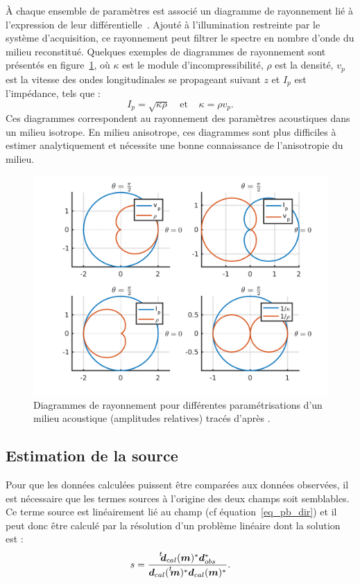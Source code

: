 À chaque ensemble de paramètres est associé un diagramme de rayonnement lié à l'expression de leur différentielle~\citep{forgues}. Ajouté à l'illumination restreinte  par le système d'acquisition, ce rayonnement peut filtrer le spectre en nombre d'onde du milieu reconstitué. Quelques exemples de diagrammes de rayonnement sont présentés en figure~\ref{rayonnement}, où $\kappa$ est le module d'incompressibilité, $\rho$ est la densité, $v_{p}$ est la vitesse des ondes longitudinales se propageant suivant $z$ et $I_{p}$ est l'impédance, tels que : 
\begin{equation*}
	I_{p}=\sqrt{\kappa \rho}~~~~~\text{et}~~~~~\kappa=\rho v_{p}\text{.}
\end{equation*}
Ces diagrammes correspondent au rayonnement des paramètres acoustiques dans un milieu isotrope. En milieu anisotrope, ces diagrammes sont plus difficiles à estimer analytiquement et nécessite une bonne connaissance de l'anisotropie du milieu.

\begin{figure}[!h]
	\centering
	\includegraphics[scale=0.7]{img/rayonnement.png}
	\caption{Diagrammes de rayonnement pour différentes paramétrisations d'un milieu acoustique (amplitudes relatives) tracés d'après \cite{forgues}.\label{rayonnement}}
\end{figure}

\subsection{Estimation de la source}
Pour que les données calculées puissent être comparées aux données observées, il est nécessaire que les termes sources à l'origine des deux champs soit semblables. Ce terme source est linéairement lié au champ (cf équation~\ref{eq_pb_dir}) et il peut donc être calculé par la résolution d'un problème linéaire \citep{pratt_99} dont la solution est : 
$$ s=\frac{\tr{\bm{d}_{cal}(\bm{m})^{*}}\bm{d}_{obs}^{*}}{\bm{d}_{cal}(\tr{\bm{m})^{*}}\bm{d}_{cal}(\bm{m})^{*}}\text{.}$$



